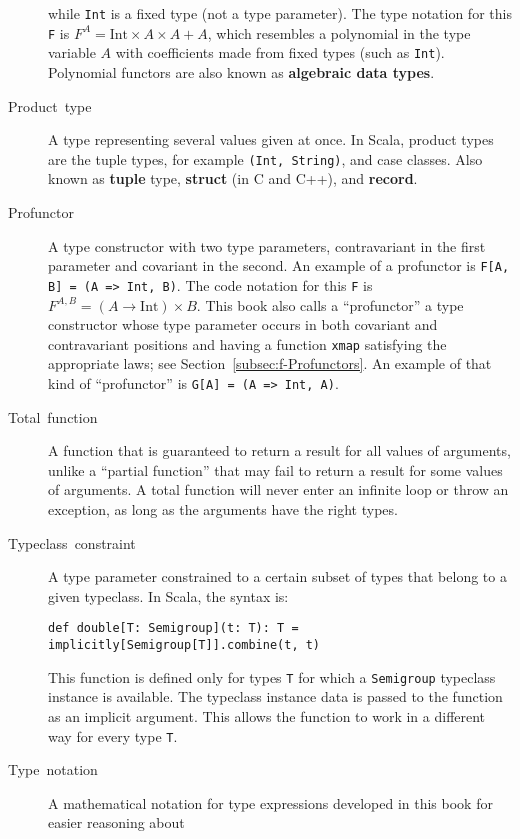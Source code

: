 \begin{description}
while \lstinline!Int! is a fixed type (not a type parameter). The
type notation for this \lstinline!F! is $F^{A}=\text{Int}\times A\times A+A$,
which resembles a polynomial in the type variable $A$ with coefficients
made from fixed types (such as \lstinline!Int!). Polynomial functors
are also known as \textbf{algebraic data types}.
\item [{Product~type}] A type representing several
values given at once. In Scala, product types are the tuple types,
for example \lstinline!(Int, String)!, and case classes. Also known
as \textbf{tuple} type, \textbf{struct} (in C and C++),
and \textbf{record}.
\item [{\index{profunctor}Profunctor}] A type constructor with two type
parameters, contravariant in the first parameter and covariant in
the second. An example of a profunctor is \lstinline!F[A, B] = (A => Int, B)!.
The code notation for this \lstinline!F! is $F^{A,B}=(A\rightarrow\text{Int})\times B$.
This book also calls a \textsf{``}profunctor\textsf{''} a type constructor whose type
parameter occurs in both covariant and contravariant positions and
having a function \lstinline!xmap! satisfying the appropriate laws;
see Section~\ref{subsec:f-Profunctors}. An example of that kind
of \textsf{``}profunctor\textsf{''} is \lstinline!G[A] = (A => Int, A)!.
\item [{Total~function}] A function that is guaranteed to return a result
for all values of arguments, unlike a \textsf{``}partial function\textsf{''} that
may fail to return a result for some values of arguments. A total
function will never enter an infinite loop or throw an exception,
as long as the arguments have the right types.
\item [{Typeclass~constraint}] A type parameter constrained to a certain
subset of types that belong to a given typeclass. In Scala, the syntax
is:
\begin{lstlisting}
def double[T: Semigroup](t: T): T = implicitly[Semigroup[T]].combine(t, t)
\end{lstlisting}
This function is defined only for types \lstinline!T! for which a
\lstinline!Semigroup! typeclass instance is available. The typeclass
instance data is passed to the function as an implicit argument. This
allows the function to work in a different way for every type \lstinline!T!.
\item [{Type~notation}] A mathematical notation
for type expressions developed in this book for easier reasoning about

\end{description}
